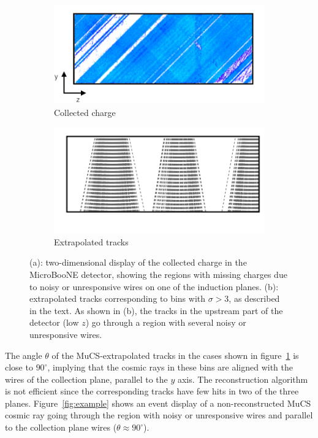 \documentclass[a4paper,11pt]{article}
\begin{document}
\begin{figure}[htbp]
  \begin{center}
    \begin{subfigure}{0.48\textwidth}
      \includegraphics[width=\linewidth]{figures/chargecoll.png}
      \caption{Collected charge}
    \end{subfigure}
    \begin{subfigure}{0.48\textwidth}
      \includegraphics[width=\linewidth]{figures/extrtracks.png}
      \caption{Extrapolated tracks}
    \end{subfigure}

    \caption{(a): two-dimensional display of the collected charge in the MicroBooNE detector, showing the regions with missing charges due to noisy or unresponsive wires on one of the induction planes. (b): extrapolated tracks corresponding to bins with $\sigma>3$, as described in the text. As shown in (b), the tracks in the upstream part of the detector (low $z$) go through a region with several noisy or unresponsive wires.} \label{fig:wires}
  \end{center}
\end{figure}


The angle $\theta$ of the MuCS-extrapolated tracks in the cases shown in figure~\ref{fig:wires} is close to $90^\circ$, implying that the cosmic rays in these bins are aligned with the wires of the collection plane, parallel to the $y$ axis. The reconstruction algorithm is not efficient since the corresponding tracks have few hits in two of the three planes. Figure~\ref{fig:example} shows an event display of a non-reconstructed MuCS cosmic ray going through the region with noisy or unresponsive wires and parallel to the collection plane wires ($\theta \approx 90^\circ$).
\end{document}
